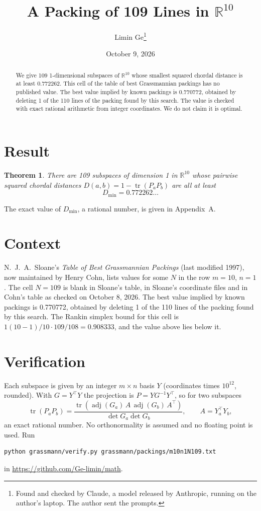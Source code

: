 \documentclass[11pt,a4paper]{article}
\title{A Packing of 109 Lines in $\mathbb{R}^{10}$}
\author{Limin Ge\thanks{Found and checked by Claude, a model released by Anthropic, running on the author's laptop. The author sent the prompts.}}
\date{October 9, 2026}
\newtheorem*{theorem}{Theorem}
\begin{document}
\maketitle
\begin{abstract}
We give 109 1-dimensional subspaces of $\mathbb{R}^{10}$ whose smallest squared chordal distance is at least 0.772262. This cell of the table of best Grassmannian packings has no published value. The best value implied by known packings is 0.770772, obtained by deleting 1 of the 110 lines of the packing found by this search. The value is checked with exact rational arithmetic from integer coordinates. We do not claim it is optimal.
\end{abstract}

\section{Result}
\begin{theorem}
There are 109 subspaces of dimension 1 in $\mathbb{R}^{10}$ whose pairwise squared chordal distances $D(a,b) = 1 - \operatorname{tr}(P_aP_b)$ are all at least
\[ D_{\min} = 0.772262\ldots \]
\end{theorem}
The exact value of $D_{\min}$, a rational number, is given in Appendix~A.


\section{Context}
N.~J.~A.~Sloane's \emph{Table of Best Grassmannian Packings} (last modified 1997), now maintained by Henry Cohn, lists values for some $N$ in the row $m=10$, $n=1$. The cell $N=109$ is blank in Sloane's table, in Sloane's coordinate files and in Cohn's table as checked on October 8, 2026. The best value implied by known packings is 0.770772, obtained by deleting 1 of the 110 lines of the packing found by this search. The Rankin simplex bound for this cell is $1(10-1)/10\cdot 109/108 = 0.908333$, and the value above lies below it.


\section{Verification}
Each subspace is given by an integer $m\times n$ basis $Y$ (coordinates times $10^{12}$, rounded). With $G=Y^\top Y$ the projection is $P=YG^{-1}Y^\top$, so for two subspaces
\[ \operatorname{tr}(P_aP_b)=\frac{\operatorname{tr}(\operatorname{adj}(G_a)\,A\,\operatorname{adj}(G_b)\,A^\top)}{\det G_a\det G_b},\qquad A=Y_a^\top Y_b, \]
an exact rational number. No orthonormality is assumed and no floating point is used. Run
\begin{verbatim}
python grassmann/verify.py grassmann/packings/m10n1N109.txt
\end{verbatim}
in \url{https://github.com/Ge-limin/math}.
\end{document}
